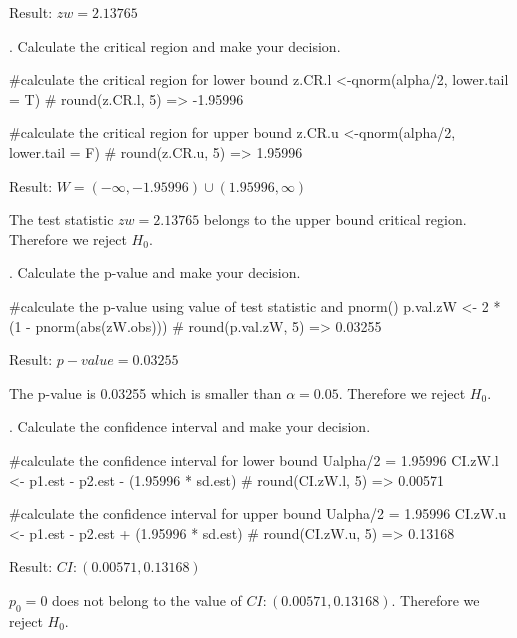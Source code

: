 \documentclass[12pt, oneside]{report}\usepackage[]{graphicx}\usepackage[]{color}
\begin{document}
Result: $zw = 2.13765 $ \newline

. Calculate the critical region and make your decision.
\begin{Schunk}
\begin{Sinput}
#calculate the critical region for lower bound
z.CR.l <-qnorm(alpha/2, lower.tail = T)
# round(z.CR.l, 5) => -1.95996

#calculate the critical region for upper bound
z.CR.u <-qnorm(alpha/2, lower.tail = F)
# round(z.CR.u, 5) => 1.95996
\end{Sinput}
\end{Schunk}

Result: $W = (-\infty, -1.95996) \cup (1.95996, \infty) $ \newline

The test statistic $zw = 2.13765$ belongs to the upper bound critical region. Therefore we reject $H_0$. \newline

. Calculate the p-value and make your decision.
\begin{Schunk}
\begin{Sinput}
#calculate the p-value using value of test statistic and pnorm()
p.val.zW <- 2 * (1 - pnorm(abs(zW.obs)))
# round(p.val.zW, 5) => 0.03255
\end{Sinput}
\end{Schunk}

Result: $p-value = 0.03255$ \newline

The p-value is 0.03255 which is smaller than $\alpha = 0.05$. Therefore we reject $H_0$. \newline

. Calculate the confidence interval and make your decision.
\begin{Schunk}
\begin{Sinput}
#calculate the confidence interval for lower bound Ualpha/2 = 1.95996
CI.zW.l <- p1.est - p2.est - (1.95996 * sd.est)
# round(CI.zW.l, 5) => 0.00571

#calculate the confidence interval for upper bound Ualpha/2 = 1.95996
CI.zW.u <- p1.est - p2.est + (1.95996 * sd.est)
# round(CI.zW.u, 5) => 0.13168
\end{Sinput}
\end{Schunk}

Result: $CI: (0.00571, 0.13168)$ \newline

$p_0 = 0$ does not belong to the value of $CI: (0.00571, 0.13168)$. Therefore we reject $H_0$. \newline
\end{document}

